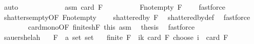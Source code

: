 \begin{isabellebody}
\ auto\isanewline
\ \ \ \ \isamarkupfalse%
\isanewline
\ \ \ \ \ \ \isamarkupfalse%
\ asm{\isacharcolon}{\kern0pt}\ {\isachardoublequoteopen}card\ F\ {\isacharequal}{\kern0pt}\ {}{\isachardoublequoteclose}\isanewline
\ \ \ \ \ \ \isamarkupfalse%
\ F{\isacharunderscore}{\kern0pt}not{\isacharunderscore}{\kern0pt}empty{\isacharcolon}{\kern0pt}\ {\isachardoublequoteopen}F\ {\isasymnoteq}\ {\isacharbraceleft}{\kern0pt}{\isacharbraceright}{\kern0pt}{\isachardoublequoteclose}\ \isamarkupfalse%
\ fastforce\isanewline
\ \ \ \ \ \ \isamarkupfalse%
\ shatters{\isacharunderscore}{\kern0pt}empty{\isacharbrackleft}{\kern0pt}OF\ F{\isacharunderscore}{\kern0pt}not{\isacharunderscore}{\kern0pt}empty{\isacharbrackright}{\kern0pt}\ \isamarkupfalse%
\ {\isachardoublequoteopen}{\isacharbraceleft}{\kern0pt}{\isacharbraceleft}{\kern0pt}{\isacharbraceright}{\kern0pt}{\isacharbraceright}{\kern0pt}\ {\isasymsubseteq}\ shattered{\isacharunderscore}{\kern0pt}by\ F{\isachardoublequoteclose}\ \isamarkupfalse%
\ shattered{\isacharunderscore}{\kern0pt}by{\isacharunderscore}{\kern0pt}def\ \isamarkupfalse%
\ fastforce\isanewline
\ \ \ \ \ \ \isamarkupfalse%
\ card{\isacharunderscore}{\kern0pt}mono{\isacharbrackleft}{\kern0pt}OF\ finite{\isacharunderscore}{\kern0pt}shF\ this{\isacharbrackright}{\kern0pt}\ asm\ \isamarkupfalse%
\ {\isacharquery}{\kern0pt}thesis\ \isamarkupfalse%
\ fastforce\isanewline
\ \ \ \ \isamarkupfalse%
\isanewline
\ \ \isamarkupfalse%
\isanewline
{}\isamarkupfalse%
%
\endisatagproof
{\isafoldproof}%
%
\isadelimproof
%
\endisadelimproof
%
\isadelimdocument
%
\endisadelimdocument
%
\isatagdocument
%
\isamarkuptrue%
%
\endisatagdocument
{\isafolddocument}%
%
\isadelimdocument
%
\endisadelimdocument
{}\isamarkupfalse%
\ sauer{\isacharunderscore}{\kern0pt}shelah{\isacharcolon}{\kern0pt}\isanewline
\ \ \ F\ {\isacharcolon}{\kern0pt}{\isacharcolon}{\kern0pt}\ {\isachardoublequoteopen}{\isacharprime}{\kern0pt}a\ set\ set{\isachardoublequoteclose}\isanewline
\ \ \ {\isachardoublequoteopen}finite\ {\isacharparenleft}{\kern0pt}{\isasymUnion}F{\isacharparenright}{\kern0pt}{\isachardoublequoteclose}\ \ {\isachardoublequoteopen}{\isacharparenleft}{\kern0pt}{\isasymSum}i{\isasymle}k{\isachardot}{\kern0pt}\ card\ {\isacharparenleft}{\kern0pt}{\isasymUnion}F{\isacharparenright}{\kern0pt}\ choose\ i{\isacharparenright}{\kern0pt}\ {\isacharless}{\kern0pt}\ card\ F{\isachardoublequoteclose}\isanewline

\end{isabellebody}
